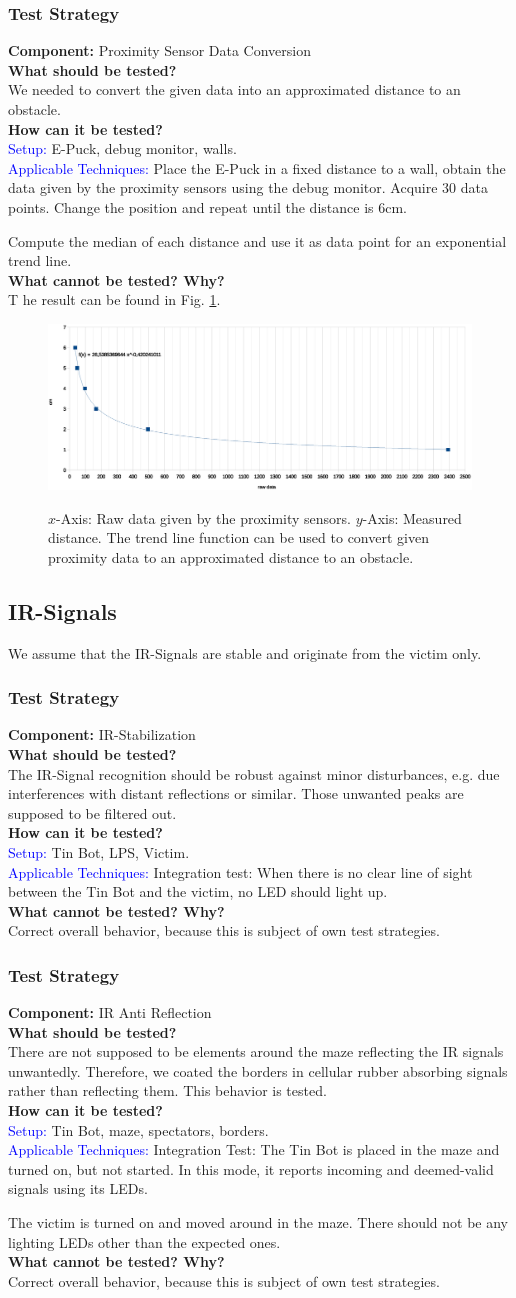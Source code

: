 \documentclass[a4paper,parskip,headheight=38pt]{scrartcl} %
\newcommand{\teststrat}[5]{
    \subsubsection{Test Strategy}
	\textbf{Component:} #1 \\
	\noindent\textbf{What should be tested?} \\
    \noindent #2 \\
	\noindent\textbf{How can it be tested?} \\
    \noindent\textcolor{blue}{Setup:} #3 \\
    \noindent\textcolor{blue}{Applicable Techniques:} #4 \\
	\noindent\textbf{What cannot be tested? Why?} \\
    \noindent #5
}
\begin{document}
\teststrat{Proximity Sensor Data Conversion}{
    We needed to convert the given data into an approximated distance to an
    obstacle. 
}{
    E-Puck, debug monitor, walls.
}{
    Place the E-Puck in a fixed distance to a wall, obtain the data given by
    the proximity sensors using the debug monitor. Acquire 30 data points.
    Change the position and repeat until the distance is 6cm.

    Compute the median of each distance and use it as data point for an
    exponential trend line.
}

The result can be found in Fig. \ref{fig:proxdata}.
\begin{figure}[t]
\noindent\includegraphics[width=\textwidth]{Proximitygraph.eps}
\label{fig:proxdata}
\caption{$x$-Axis: Raw data given by the proximity sensors. $y$-Axis: Measured
distance. The trend line function can be used to convert given proximity data
to an approximated distance to an obstacle.}
\end{figure}

\subsection{IR-Signals}
We assume that the IR-Signals are stable and originate from the victim only.

\teststrat{IR-Stabilization}{
    The IR-Signal recognition should be robust against minor disturbances, e.g.
    due interferences with distant reflections or similar.
    Those unwanted peaks are supposed to be filtered out.
}{
    Tin Bot, LPS, Victim.
}{
    Integration test: When there is no clear line of sight between the Tin Bot
    and the victim, no LED should light up.
}{
    Correct overall behavior, because this is subject of own test strategies.
}

\teststrat{IR Anti Reflection}{
    There are not supposed to be elements around the maze reflecting the IR
    signals unwantedly. Therefore, we coated the borders in cellular rubber
    absorbing signals rather than reflecting them. This behavior is tested.
}{
    Tin Bot, maze, spectators, borders.
}{
    Integration Test: 
    The Tin Bot is placed in the maze and turned on, but not
    started. In this mode, it reports incoming and deemed-valid signals using
    its LEDs. 

    The victim is turned on and moved around in the maze. There should not be
    any lighting LEDs other than the expected ones.
}{
    Correct overall behavior, because this is subject of own test strategies.
}
\end{document}
